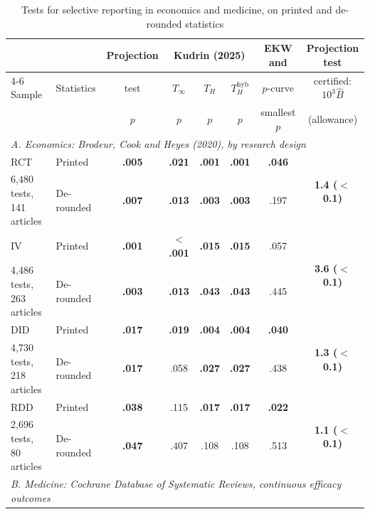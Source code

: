 \begin{table}[!htbp]\centering
\begin{threeparttable}
\caption{Tests for selective reporting in economics and medicine, on printed and de-rounded statistics}
\label{tab:main_applications}
\begin{tabular}{llcccccc}
\toprule
 & & Projection & \multicolumn{3}{c}{Kudrin (2025)} & EKW and & Projection test \\
\cmidrule(lr){4-6}
Sample & Statistics & test & $T_\infty$ & $T_H$ & $T_H^{\mathrm{hyb}}$ & $p$-curve & certified: $10^3 \hat B$ \\
 & & $p$ & $p$ & $p$ & $p$ & smallest $p$ & (allowance) \\
\midrule
\multicolumn{8}{l}{\textit{A. Economics: Brodeur, Cook and Heyes (2020), by research design}} \\
RCT & Printed & \textbf{.005} & \textbf{.021} & \textbf{.001} & \textbf{.001} & \textbf{.046} & \multirow{2}{*}{\textbf{1.4 ($<$0.1)}} \\
{\footnotesize 6,480 tests, 141 articles} & De-rounded & \textbf{.007} & \textbf{.013} & \textbf{.003} & \textbf{.003} & .197 & \\
\addlinespace[2pt]
IV & Printed & \textbf{.001} & \textbf{$<$.001} & \textbf{.015} & \textbf{.015} & .057 & \multirow{2}{*}{\textbf{3.6 ($<$0.1)}} \\
{\footnotesize 4,486 tests, 263 articles} & De-rounded & \textbf{.003} & \textbf{.013} & \textbf{.043} & \textbf{.043} & .445 & \\
\addlinespace[2pt]
DID & Printed & \textbf{.017} & \textbf{.019} & \textbf{.004} & \textbf{.004} & \textbf{.040} & \multirow{2}{*}{\textbf{1.3 ($<$0.1)}} \\
{\footnotesize 4,730 tests, 218 articles} & De-rounded & \textbf{.017} & .058 & \textbf{.027} & \textbf{.027} & .438 & \\
\addlinespace[2pt]
RDD & Printed & \textbf{.038} & .115 & \textbf{.017} & \textbf{.017} & \textbf{.022} & \multirow{2}{*}{\textbf{1.1 ($<$0.1)}} \\
{\footnotesize 2,696 tests,  80 articles} & De-rounded & \textbf{.047} & .407 & .108 & .108 & .513 & \\
\midrule
\multicolumn{8}{l}{\textit{B. Medicine: Cochrane Database of Systematic Reviews, continuous efficacy outcomes}} \\

\end{tabular}
\end{threeparttable}
\end{table}
